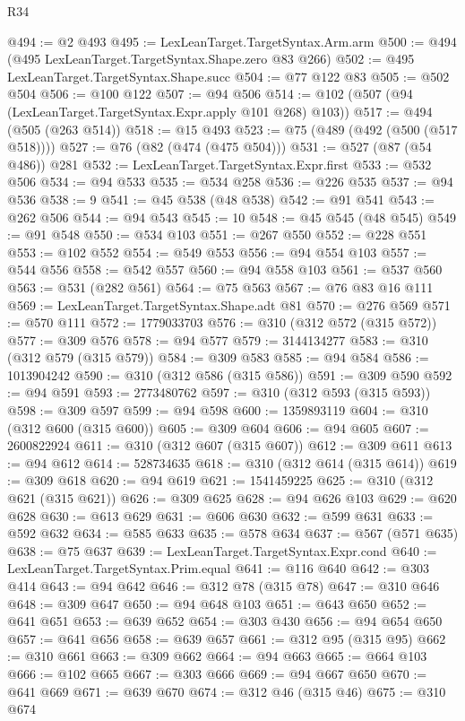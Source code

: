 \begin{lexlean}{R34}
\begin{coremodule}
@494 := @2 @493
@495 := LexLeanTarget.TargetSyntax.Arm.arm
@500 := @494 (@495 LexLeanTarget.TargetSyntax.Shape.zero @83 @266)
@502 := @495 LexLeanTarget.TargetSyntax.Shape.succ
@504 := @77 @122 @83
@505 := @502 @504
@506 := @100 @122
@507 := @94 @506
@514 := @102 (@507 (@94 (LexLeanTarget.TargetSyntax.Expr.apply @101 @268) @103))
@517 := @494 (@505 (@263 @514))
@518 := @15 @493
@523 := @75 (@489 (@492 (@500 (@517 @518))))
@527 := @76 (@82 (@474 (@475 @504)))
@531 := @527 (@87 (@54 @486)) @281
@532 := LexLeanTarget.TargetSyntax.Expr.first
@533 := @532 @506
@534 := @94 @533
@535 := @534 @258
@536 := @226 @535
@537 := @94 @536
@538 := 9
@541 := @45 @538 (@48 @538)
@542 := @91 @541
@543 := @262 @506
@544 := @94 @543
@545 := 10
@548 := @45 @545 (@48 @545)
@549 := @91 @548
@550 := @534 @103
@551 := @267 @550
@552 := @228 @551
@553 := @102 @552
@554 := @549 @553
@556 := @94 @554 @103
@557 := @544 @556
@558 := @542 @557
@560 := @94 @558 @103
@561 := @537 @560
@563 := @531 (@282 @561)
@564 := @75 @563
@567 := @76 @83 @16 @111
@569 := LexLeanTarget.TargetSyntax.Shape.adt @81
@570 := @276 @569
@571 := @570 @111
@572 := 1779033703
@576 := @310 (@312 @572 (@315 @572))
@577 := @309 @576
@578 := @94 @577
@579 := 3144134277
@583 := @310 (@312 @579 (@315 @579))
@584 := @309 @583
@585 := @94 @584
@586 := 1013904242
@590 := @310 (@312 @586 (@315 @586))
@591 := @309 @590
@592 := @94 @591
@593 := 2773480762
@597 := @310 (@312 @593 (@315 @593))
@598 := @309 @597
@599 := @94 @598
@600 := 1359893119
@604 := @310 (@312 @600 (@315 @600))
@605 := @309 @604
@606 := @94 @605
@607 := 2600822924
@611 := @310 (@312 @607 (@315 @607))
@612 := @309 @611
@613 := @94 @612
@614 := 528734635
@618 := @310 (@312 @614 (@315 @614))
@619 := @309 @618
@620 := @94 @619
@621 := 1541459225
@625 := @310 (@312 @621 (@315 @621))
@626 := @309 @625
@628 := @94 @626 @103
@629 := @620 @628
@630 := @613 @629
@631 := @606 @630
@632 := @599 @631
@633 := @592 @632
@634 := @585 @633
@635 := @578 @634
@637 := @567 (@571 @635)
@638 := @75 @637
@639 := LexLeanTarget.TargetSyntax.Expr.cond
@640 := LexLeanTarget.TargetSyntax.Prim.equal
@641 := @116 @640
@642 := @303 @414
@643 := @94 @642
@646 := @312 @78 (@315 @78)
@647 := @310 @646
@648 := @309 @647
@650 := @94 @648 @103
@651 := @643 @650
@652 := @641 @651
@653 := @639 @652
@654 := @303 @430
@656 := @94 @654 @650
@657 := @641 @656
@658 := @639 @657
@661 := @312 @95 (@315 @95)
@662 := @310 @661
@663 := @309 @662
@664 := @94 @663
@665 := @664 @103
@666 := @102 @665
@667 := @303 @666
@669 := @94 @667 @650
@670 := @641 @669
@671 := @639 @670
@674 := @312 @46 (@315 @46)
@675 := @310 @674

\end{coremodule}
\end{lexlean}
